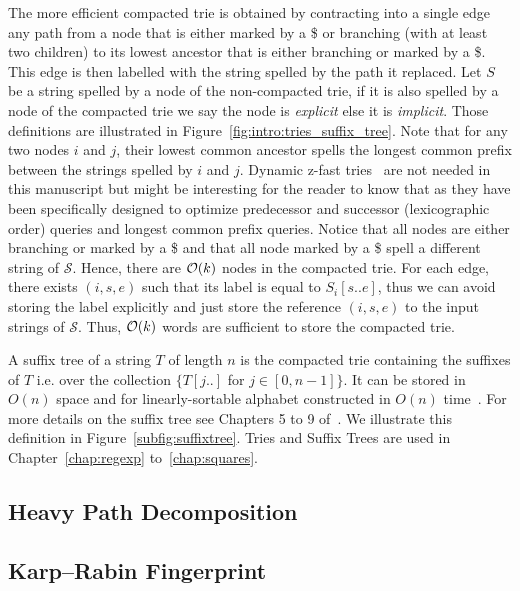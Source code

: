 The more efficient compacted trie is obtained by contracting  into a single edge any path from a node that is either marked by a \$ or branching (with at least two children) to its lowest ancestor that is either branching or marked by a \$.
This edge is then labelled with the string spelled by the path it replaced.
Let $S$ be a string spelled by a node of the non-compacted trie, if it is also spelled by a node of the compacted trie we say the node is \emph{explicit} else it is \emph{implicit}. Those definitions are illustrated in Figure~\ref{fig:intro:tries_suffix_tree}. Note that for any two nodes $i$ and $j$, their lowest common ancestor spells the longest common prefix between the strings spelled by $i$ and $j$.
Dynamic z-fast tries~\cite{belazzougui2010dynamic} are not needed in this manuscript but might be interesting for the reader to know that as they have been specifically designed to optimize predecessor and successor (lexicographic order) queries and longest common prefix queries.
%
Notice that all nodes are either branching or marked by a \$ and that all node marked by a \$ spell a different string of $\mathcal{S}$. 
Hence, there are $\mathcal{O}(k)$ nodes in the compacted trie.
For each edge, there exists $(i,s,e)$ such that its label is equal to $S_i[s .. e]$, thus we can avoid storing the label explicitly and just store the reference $(i,s,e)$ to the input strings of $\mathcal{S}$.
Thus, $\mathcal{O}(k)$ words are sufficient to store the compacted trie.

A suffix tree of a string $T$ of length $n$ is the compacted trie containing the suffixes of $T$ i.e. over the collection $\{T[j..]$ for $ j \in [0,n-1] \}$. It can be stored in $O(n)$ space and for linearly-sortable alphabet constructed in $O(n)$ time~\cite{Farach1997}. For more details on the suffix tree see Chapters 5 to 9 of~\cite{Gusfield1997}. We illustrate this definition in Figure~\ref{subfig:suffixtree}. Tries and Suffix Trees are used in Chapter~\ref{chap:regexp} to~\ref{chap:squares}.



\subsection{Heavy Path Decomposition}\label{sec:prelim:HP}

\subsection{Karp--Rabin Fingerprint}\label{sec:prelim:KR}

